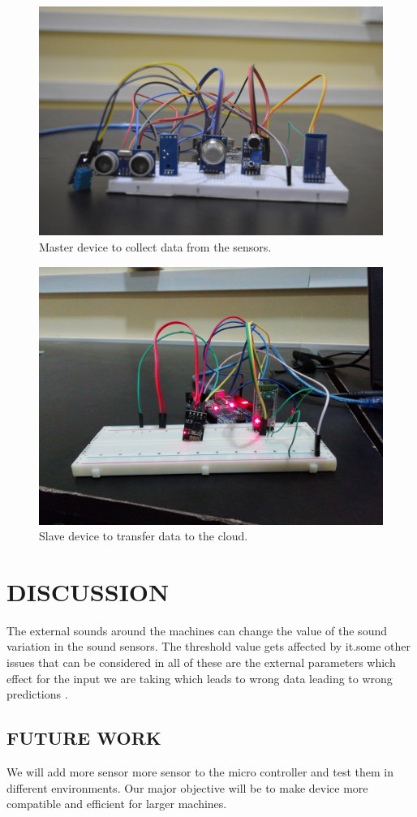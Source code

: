 \begin{figure}[h]
\centerline{\includegraphics[width=4.7in]{master2}}
\caption{Master device to collect data from the sensors.}
\end{figure}
\vspace{0.3in}
\begin{figure}[h]
\centerline{\includegraphics[width=4.7in]{sl}}
\caption{Slave device to transfer data to the cloud.}
\end{figure}
\newpage



\newpage
\section{DISCUSSION}
The external sounds around the machines can change the value of the sound variation in the sound sensors. The threshold value gets affected by it.some other issues that can be considered in all of these are the external parameters which effect for the input we are taking which leads to wrong data leading to wrong predictions .\\
\subsection{FUTURE WORK}
We will add more sensor more sensor to the micro controller and test them in different environments. Our major objective will be to make device more compatible and efficient for larger machines. 